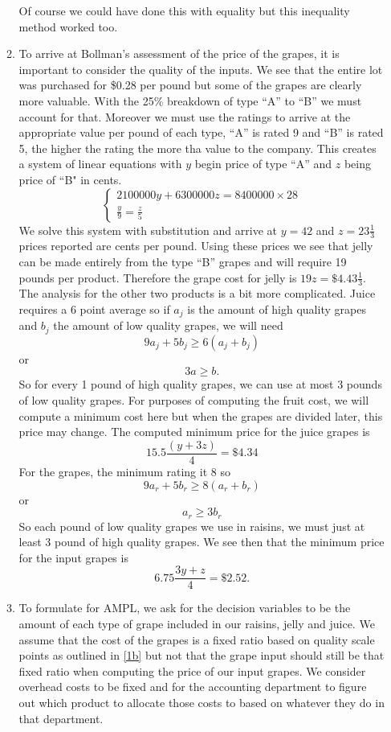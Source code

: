 \documentclass[11pt]{article}
\begin{document}
\begin{enumerate}
\begin{enumerate}
Of course we could have done this with equality but this inequality method worked too.

\item To arrive at Bollman's assessment of the price of the grapes, it is important to consider the quality of the inputs.  We see that the entire lot was purchased for \$0.28 per pound but some of the grapes are clearly more valuable.  With the 25\% breakdown of type ``A'' to ``B'' we must account for that.  Moreover we must use the ratings to arrive at the appropriate value per pound of each type, ``A'' is rated 9 and ``B'' is rated 5, the higher the rating the more tha value to the company.  This creates a system of linear equations with $y$ begin price of type ``A'' and $z$ being price of ``B" in cents.  
\[
\left\{
\begin{array}{l}
2 100 000 y +6 300 000 z = 8 400 000 \times 28\\
\frac{y}{9} = \frac{z}{5}
\end{array}
\right.
\]
We solve this system with substitution and arrive at $y = 42$ and $z = 23\frac13$ prices reported are cents per pound.  Using these prices we see that jelly can be made entirely from the type ``B'' grapes and will require 19 pounds per product.  Therefore the grape cost for jelly is $19z = \$4.43\frac13$.  The analysis for the other two products is a bit more complicated.  Juice requires a 6 point average so if $a_j$ is the amount of high quality grapes and $b_j$ the amount of low quality grapes, we will need 
\[
9a_j+5b_j \geq 6(a_j+b_j)
\]
or
\[
3a \geq b.
\]
So for every 1 pound of high quality grapes, we can use at most 3 pounds of low quality grapes.  For purposes of computing the fruit cost, we will compute a minimum cost here but when the grapes are divided later, this price may change.  The computed minimum price for the juice grapes is
\[
15.5\frac{\left(y+3z\right)}{4} = \$4.34
\]
For the grapes, the minimum rating it 8 so
\[
9a_r+5b_r\geq 8(a_r+b_r)
\]
or
\[
a_r\geq 3b_r
\]
So each pound of low quality grapes we use in raisins, we must just at least 3 pound of high quality grapes.  We see then that the minimum price for the input grapes is \label{1b}
\[
6.75\frac{3y+z}4 = \$2.52.
\]
\item To formulate for AMPL, we ask for the decision variables to be the amount of each type of grape included in our raisins, jelly and juice.  We assume that the cost of the grapes is a fixed ratio based on quality scale points as outlined in \ref{1b} but not that the grape input should still be that fixed ratio when computing the price of our input grapes.  We consider overhead costs to be fixed and for the accounting department to figure out which product to allocate those costs to based on whatever they do in that department.


\end{enumerate}
\end{enumerate}
\end{document}
